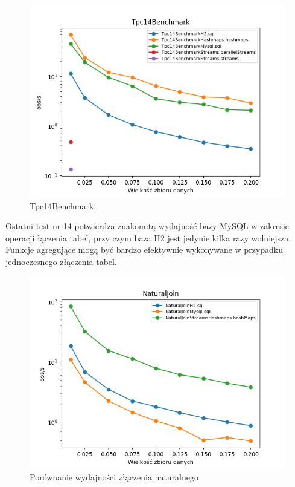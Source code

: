 \documentclass[12pt,twoside,openright]{extarticle}
\begin{document}
\newpage
\begin{figure}[H]
\centering
\includegraphics[width=15cm]{plots/Tpc14Benchmark}
\caption{Tpc14Benchmark}
\end{figure}

    Ostatni test nr 14 potwierdza znakomitą wydajność bazy MySQL w zakresie operacji łączenia tabel, przy czym baza H2 jest jedynie kilka razy wolniejsza. Funkcje agregujące mogą być bardzo efektywnie wykonywane w przypadku jednoczesnego złączenia tabel.

\newpage
\begin{figure}[H]
    \centering
    \includegraphics[width=13cm]{plots/NaturalJoin}
    \caption{Porównanie wydajności złączenia naturalnego}
    \label{fig:naturaljoingraph}
\end{figure}
\end{document}
